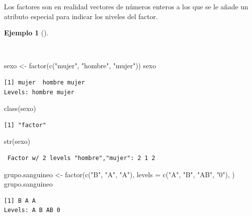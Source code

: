 \documentclass[
  spanish,
  a4paper,
]{scrreport}
\newenvironment{Shaded}{\begin{snugshade}}{\end{snugshade}}
\newcommand{\AttributeTok}[1]{\textcolor[rgb]{0.40,0.45,0.13}{#1}}
\newcommand{\FunctionTok}[1]{\textcolor[rgb]{0.28,0.35,0.67}{#1}}
\newcommand{\NormalTok}[1]{\textcolor[rgb]{0.00,0.23,0.31}{#1}}
\newcommand{\OtherTok}[1]{\textcolor[rgb]{0.00,0.23,0.31}{#1}}
\newcommand{\StringTok}[1]{\textcolor[rgb]{0.13,0.47,0.30}{#1}}
\theoremstyle{definition}
\theoremstyle{definition}
\newtheorem{example}{Ejemplo}[chapter]
\theoremstyle{remark}
\begin{document}
Los factores son en realidad vectores de números enteros a los que se le
añade un atributo especial para indicar los niveles del factor.

\begin{example}[]\protect\hypertarget{exm-creacion-factores}{}\label{exm-creacion-factores}

~

\begin{Shaded}
\begin{Highlighting}[]
\NormalTok{sexo }\OtherTok{\textless{}{-}} \FunctionTok{factor}\NormalTok{(}\FunctionTok{c}\NormalTok{(}\StringTok{"mujer"}\NormalTok{, }\StringTok{"hombre"}\NormalTok{, }\StringTok{"mujer"}\NormalTok{))}
\NormalTok{sexo}
\end{Highlighting}
\end{Shaded}

\begin{verbatim}
[1] mujer  hombre mujer 
Levels: hombre mujer
\end{verbatim}

\begin{Shaded}
\begin{Highlighting}[]
\FunctionTok{class}\NormalTok{(sexo)}
\end{Highlighting}
\end{Shaded}

\begin{verbatim}
[1] "factor"
\end{verbatim}

\begin{Shaded}
\begin{Highlighting}[]
\FunctionTok{str}\NormalTok{(sexo)}
\end{Highlighting}
\end{Shaded}

\begin{verbatim}
 Factor w/ 2 levels "hombre","mujer": 2 1 2
\end{verbatim}

\begin{Shaded}
\begin{Highlighting}[]
\NormalTok{grupo.sanguineo }\OtherTok{\textless{}{-}} \FunctionTok{factor}\NormalTok{(}\FunctionTok{c}\NormalTok{(}\StringTok{"B"}\NormalTok{, }\StringTok{"A"}\NormalTok{, }\StringTok{"A"}\NormalTok{), }\AttributeTok{levels =} \FunctionTok{c}\NormalTok{(}\StringTok{"A"}\NormalTok{, }\StringTok{"B"}\NormalTok{, }\StringTok{"AB"}\NormalTok{, }\StringTok{"0"}\NormalTok{), )}
\NormalTok{grupo.sanguineo}
\end{Highlighting}
\end{Shaded}

\begin{verbatim}
[1] B A A
Levels: A B AB 0
\end{verbatim}

\end{example}
\end{document}

